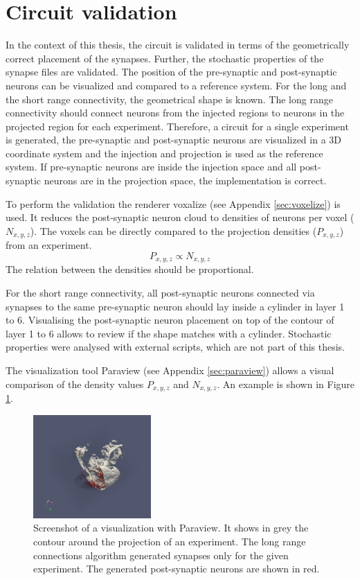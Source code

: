 \section{Circuit validation}
In the context of this thesis, the circuit is validated in terms of the geometrically correct placement of
the synapses. Further, the stochastic properties of the synapse files are validated.
The position of the pre-synaptic and post-synaptic neurons can be visualized and  compared to a 
reference system. For the long and the short range connectivity, the geometrical shape is known.
The long range connectivity should connect neurons from the injected regions to neurons
in the projected region for each experiment. Therefore, a circuit for a single experiment is 
generated, the pre-synaptic and post-synaptic neurons are visualized in a 3D coordinate system and the injection
and projection is used as the reference system. If pre-synaptic neurons are inside the injection space and all
post-synaptic neurons are in the projection space, the implementation is correct.

To perform the validation the renderer voxalize (see Appendix \ref{sec:voxelize}) is used.
It reduces the post-synaptic neuron cloud to densities of neurons per voxel ($N_{x,y,z}$).
The voxels can be directly compared to the projection densities ($P_{x,y,z}$) from an experiment.
\begin{equation}
	P_{x,y,z} \propto N_{x,y,z}
\end{equation}
The relation between the densities should be proportional.

For the short range connectivity, all post-synaptic neurons connected via synapses to the same pre-synaptic neuron should
lay inside a cylinder in layer 1 to 6. Visualising the post-synaptic neuron placement on top of the contour of layer 1 to
6 allows to review if the shape matches with a cylinder.
Stochastic properties were analysed with external scripts, which are not part of this thesis.

The visualization tool Paraview (see Appendix \ref{sec:paraview}) allows a visual comparison of the density values $P_{x,y,z}$ and $N_{x,y,z}$.
An example is shown in Figure \ref{fig:paraviewex}.
 \begin{figure}[ht!]
\centering
\includegraphics[width=0.4\textwidth]{pictures/paraview_ex.png}
\caption[Screenshot of Paraview]{Screenshot of a visualization with Paraview. It shows in grey the contour around the projection of an experiment.
The long range connections algorithm generated synapses only for the given experiment. 
The generated post-synaptic neurons are shown in red.}
\label{fig:paraviewex}
\end{figure}

